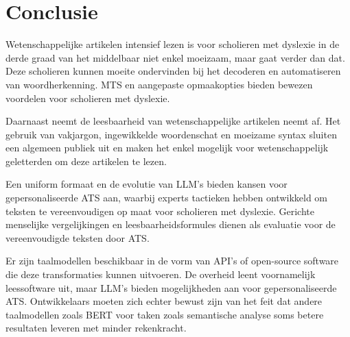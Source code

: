 \section{Conclusie}

Wetenschappelijke artikelen intensief lezen is voor scholieren met dyslexie in de derde graad van het middelbaar niet enkel moeizaam, maar gaat verder dan dat. Deze scholieren kunnen moeite ondervinden bij het decoderen en automatiseren van woordherkenning. MTS en aangepaste opmaakopties bieden bewezen voordelen voor scholieren met dyslexie.

Daarnaast neemt de leesbaarheid van wetenschappelijke artikelen neemt af. Het gebruik van vakjargon, ingewikkelde woordenschat en moeizame syntax sluiten een algemeen publiek uit en maken het enkel mogelijk voor wetenschappelijk geletterden om deze artikelen te lezen.

Een uniform formaat en de evolutie van LLM's bieden kansen voor gepersonaliseerde ATS aan, waarbij experts tactieken hebben ontwikkeld om teksten te vereenvoudigen op maat voor scholieren met dyslexie. Gerichte menselijke vergelijkingen en leesbaarheidsformules dienen als evaluatie voor de vereenvoudigde teksten door ATS.

Er zijn taalmodellen beschikbaar in de vorm van API's of open-source software die deze transformaties kunnen uitvoeren. De overheid leent voornamelijk leessoftware uit, maar LLM's bieden mogelijkheden aan voor gepersonaliseerde ATS. Ontwikkelaars moeten zich echter bewust zijn van het feit dat andere taalmodellen zoals BERT voor taken zoals semantische analyse soms betere resultaten leveren met minder rekenkracht.